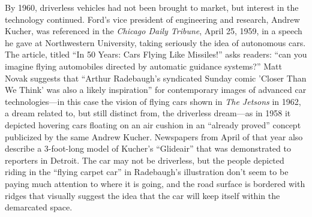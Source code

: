 By 1960, driverless vehicles had not been brought to market, but
interest in the technology continued. Ford's vice president of
engineering and research, Andrew Kucher, was referenced in the \emph{Chicago
Daily Tribune}, April 25, 1959, in a speech he gave at Northwestern
University, taking seriously the idea of autonomous cars. The article,
titled ``In 50 Years: Cars Flying Like Missiles!'' asks readers: ``can
you imagine flying automobiles directed by automatic guidance
systems?''\cite{???} Matt Novak suggests that ``Arthur Radebaugh's syndicated
Sunday comic 'Closer Than We Think' was also a likely inspiration''
for contemporary images of advanced car technologies---in this case
the vision of flying cars shown in \emph{The Jetsons} in 1962, a
dream related to, but still distinct from, the driverless dream---as in
1958 it depicted hovering 
cars floating on an air cushion in an ``already proved'' concept
publicized by the same Andrew Kucher\cite{???}. Newspapers from April of that
year also describe a 3-foot-long model of Kucher's ``Glideair'' that was
demonstrated to reporters in Detroit\cite{???}. The car may not be driverless,
but the people depicted riding in the ``flying carpet car'' in
Radebaugh's illustration don't seem to be paying much attention to
where it is going, and the road surface is bordered with ridges that
visually suggest the idea that the car will keep itself within the
demarcated space.

